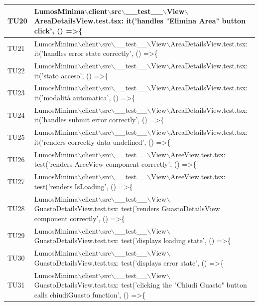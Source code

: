 \documentclass[12pt]{article}
\begin{document}
\begin{scriptsize}
\begin{xltabular}{\linewidth}{|>{\hsize}X|X|}
	TU20 & LumosMinima$\backslash$client$\backslash$src$\backslash$\_\_test\_\_$\backslash$View$\backslash$AreaDetailsView.test.tsx: it('handles "Elimina Area" button click', () =\textgreater \{ \\ \hline
	TU21 & LumosMinima$\backslash$client$\backslash$src$\backslash$\_\_test\_\_$\backslash$View$\backslash$AreaDetailsView.test.tsx: it('handles error state correctly', () =\textgreater \{ \\ \hline
	TU22 & LumosMinima$\backslash$client$\backslash$src$\backslash$\_\_test\_\_$\backslash$View$\backslash$AreaDetailsView.test.tsx: it('stato acceso', () =\textgreater \{ \\ \hline
	TU23 & LumosMinima$\backslash$client$\backslash$src$\backslash$\_\_test\_\_$\backslash$View$\backslash$AreaDetailsView.test.tsx: it('modalità automatica', () =\textgreater \{ \\ \hline
	TU24 & LumosMinima$\backslash$client$\backslash$src$\backslash$\_\_test\_\_$\backslash$View$\backslash$AreaDetailsView.test.tsx: it('handles submit error correctly', () =\textgreater \{ \\ \hline
	TU25 & LumosMinima$\backslash$client$\backslash$src$\backslash$\_\_test\_\_$\backslash$View$\backslash$AreaDetailsView.test.tsx: it('renders correctly data undefined', () =\textgreater \{ \\ \hline
	TU26 & LumosMinima$\backslash$client$\backslash$src$\backslash$\_\_test\_\_$\backslash$View$\backslash$AreeView.test.tsx: test('renders AreeView component correctly', () =\textgreater \{ \\ \hline
	TU27 & LumosMinima$\backslash$client$\backslash$src$\backslash$\_\_test\_\_$\backslash$View$\backslash$AreeView.test.tsx: test('renders IsLoading', () =\textgreater \{ \\ \hline
	TU28 & LumosMinima$\backslash$client$\backslash$src$\backslash$\_\_test\_\_$\backslash$View$\backslash$GuastoDetailsView.test.tsx: test('renders GuastoDetailsView component correctly', () =\textgreater \{ \\ \hline
	TU29 & LumosMinima$\backslash$client$\backslash$src$\backslash$\_\_test\_\_$\backslash$View$\backslash$GuastoDetailsView.test.tsx: test('displays loading state', () =\textgreater \{ \\ \hline
	TU30 & LumosMinima$\backslash$client$\backslash$src$\backslash$\_\_test\_\_$\backslash$View$\backslash$GuastoDetailsView.test.tsx: test('displays error state', () =\textgreater \{ \\ \hline
	TU31 & LumosMinima$\backslash$client$\backslash$src$\backslash$\_\_test\_\_$\backslash$View$\backslash$GuastoDetailsView.test.tsx: test('clicking the "Chiudi Guasto" button calls chiudiGuasto function', () =\textgreater \{ \\ \hline

\end{xltabular}
\end{scriptsize}
\end{document}
